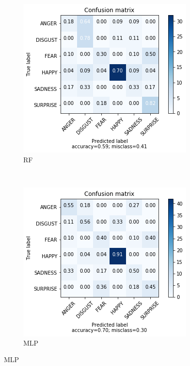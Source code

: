 {\begin{figure}
\begin{subfigure}[b]{0.3\textwidth}
        \includegraphics[width=\textwidth]{figures/pca-rf}
        \caption{RF}
        \label{fig:pca-rf}
    \end{subfigure}
    ~
    \begin{subfigure}[b]{0.3\textwidth}
        \includegraphics[width=\textwidth]{figures/pca-mlp}
        \caption{MLP}
        \label{fig:pca-mlp}
    \end{subfigure}

\end{figure}}
